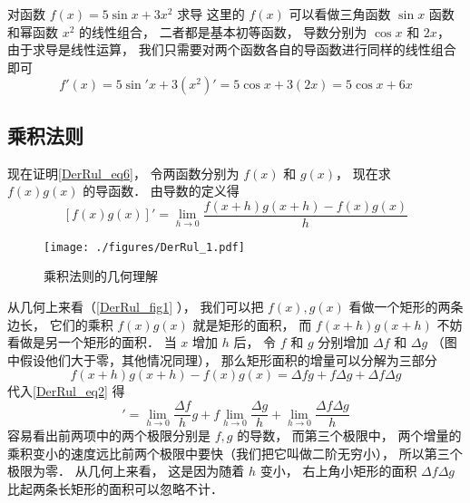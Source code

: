 \begin{example}{对函数 $f(x) = 5\sin x + 3x^2$ 求导}
这里的 $f(x)$ 可以看做三角函数 $\sin x$ 函数和幂函数 $x^2$ 的线性组合， 二者都是基本初等函数， 导数分别为 $\cos x$ 和 $2x$， 由于求导是线性运算， 我们只需要对两个函数各自的导函数进行同样的线性组合即可
\begin{equation}
f'(x) = 5 \sin' x + 3(x^2)' = 5 \cos x + 3(2x) = 5\cos x + 6x
\end{equation}
\end{example}

\subsection{乘积法则}
现在证明\autoref{DerRul_eq6}， 令两函数分别为 $f(x)$ 和 $g(x)$， 现在求 $f(x) g(x)$ 的导函数． 由导数的定义得
\begin{equation}\label{DerRul_eq2}
[f(x)g(x)]' = \lim_{h\to 0} \frac{f(x+h)g(x+h) - f(x)g(x)}{h}
\end{equation}

\begin{figure}[ht]
\centering
\texttt{[image: ./figures/DerRul\_1.pdf]}
\caption{乘积法则的几何理解} \label{DerRul_fig1}
\end{figure}

从几何上来看（\autoref{DerRul_fig1} ）， 我们可以把 $f(x), g(x)$ 看做一个矩形的两条边长， 它们的乘积 $f(x)g(x)$ 就是矩形的面积， 而 $f(x+h)g(x+h)$ 不妨看做是另一个矩形的面积． 当 $x$ 增加 $h$ 后， 令 $f$ 和 $g$ 分别增加 $\Delta f$ 和 $\Delta g$ （图中假设他们大于零，其他情况同理）， 那么矩形面积的增量可以分解为三部分
\begin{equation}
f(x+h)g(x+h) - f(x)g(x) = \Delta f g + f \Delta g + \Delta f\Delta g
\end{equation}
代入\autoref{DerRul_eq2} 得
\begin{equation}
[f(x)g(x)]' = \lim_{h\to 0} \frac{\Delta f}{h} g + f \lim_{h\to 0} \frac{\Delta g}{h} + \lim_{h\to 0}\frac{\Delta f\Delta g}{h}
\end{equation}
容易看出前两项中的两个极限分别是 $f,g$ 的导数， 而第三个极限中， 两个增量的乘积变小的速度远比前两个极限中要快（我们把它叫做二阶无穷小）， 所以第三个极限为零． 从几何上来看， 这是因为随着 $h$ 变小， 右上角小矩形的面积 $\Delta f\Delta g$ 比起两条长矩形的面积可以忽略不计．

